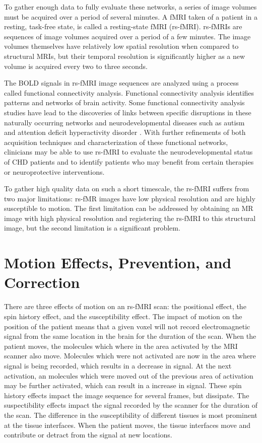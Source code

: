 To gather enough data to fully evaluate these networks, a series of image volumes must be acquired over a period of several minutes. A fMRI taken of a patient in a resting, task-free state, is called a resting-state fMRI (rs-fMRI). rs-fMRIs are sequences of image volumes acquired over a period of a few minutes. The image volumes themselves have relatively low spatial resolution when compared to structural MRIs, but their temporal resolution is significantly higher as a new volume is acquired every two to three seconds. 

The BOLD signals in rs-fMRI image sequences are analyzed using a process called functional connectivity analysis. Functional connectivity analysis identifies patterns and networks of brain activity. Some functional connectivity analysis studies have lead to the discoveries of links between specific disruptions in these naturally occurring networks and neurodevelopmental diseases such as autism and attention deficit hyperactivity disorder \cite{Assaf2010} \cite{Zang2007}. With further refinements of both acquisition techniques and characterization of these functional networks, clinicians may be able to use rs-fMRI to evaluate the neurodevelopmental status of CHD patients and to identify patients who may benefit from certain therapies or neuroprotective interventions.

To gather high quality data on such a short timescale, the rs-fMRI suffers from two major limitations: rs-fMR images have low physical resolution and are highly susceptible to motion. The first limitation can be addressed by obtaining an MR image with high physical resolution and registering the rs-fMRI to this structural image, but the second limitation is a significant problem. 

\section{Motion Effects, Prevention, and Correction}

There are three effects of motion on an rs-fMRI scan: the positional effect, the spin history effect, and the susceptibility effect. The impact of motion on the position of the patient means that a given voxel will not record electromagnetic signal from the same location in the brain for the duration of the scan. When the patient moves, the molecules which where in the area activated by the MRI scanner also move. Molecules which were not activated are now in the area where signal is being recorded, which results in a decrease in signal. At the next activation, an molecules which were moved out of the previous area of activation may be further activated, which can result in a increase in signal. These spin history effects impact the image sequence for several frames, but dissipate. The suspectibility effects impact the signal recorded by the scanner for the duration of the scan. The difference in the susceptibility of different tissues is most prominent at the tissue interfaces. When the patient moves, the tissue interfaces move and contribute or detract from the signal at new locations. 

